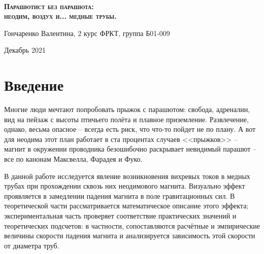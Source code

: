 \documentclass[a4paper,12pt]{article} %
\begin{document}

\begin{titlepage}
\begin{center}
\
\vfill

{\LARGE \textsc{\textbf{Парашютист без парашюта: \\неодим, воздух и... медные трубы.\\}}}

\vspace{2em}

Гончаренко Валентина, 2 курс ФРКТ, группа Б01-009

\vfill

Декабрь 2021
\end{center}
\end{titlepage}


\newpage
\tableofcontents{} %
\newpage


\section{Введение}

Многие люди мечтают попробовать прыжок с парашютом: свобода, адреналин, вид на пейзаж с высоты птичьего полёта и плавное приземление. Развлечение, однако, весьма опасное -- всегда есть риск, что что-то пойдет не по плану. А вот для неодима этот план работает в ста процентах случаев <<прыжков>> -- магнит в окружении проводника безошибочно раскрывает невидимый парашют -- все по канонам Максвелла, Фарадея и Фуко.

В данной работе исследуется явление возникновения вихревых токов в медных трубах при прохождении сквозь них неодимового магнита. Визуально эффект проявляется в замедлении падения магнита в поле гравитационных сил. В теоретической части рассматривается математическое описание этого эффекта; экспериментальная часть проверяет соответствие практических значений и теоретических подсчетов: в частности, сопоставляются расчётные и эмпирические величины скорости падения магнита и анализируется зависимость этой скорости от диаметра труб.



\newpage

\end{document}
